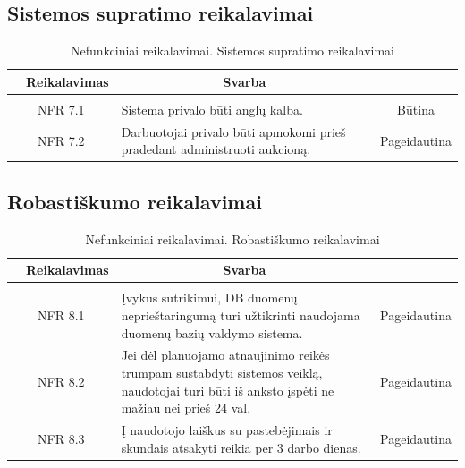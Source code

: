 \documentclass{VUMIFPSkursinis}
\begin{document}
	\subsection{Sistemos supratimo reikalavimai}
	\begin{table}[H]
		\caption{Nefunkciniai reikalavimai. Sistemos supratimo reikalavimai}
		\begin{tabular}{|p{1cm}|p{1cm}|p{}|p{}|}
			\hline
			\rowcolor{gray!50}
			\multicolumn{2}{|c|}{{\bfseries Kodas}}&
			\multicolumn{1}{c|}{{\bfseries Reikalavimas}}&
			\multicolumn{1}{c|}{{\bfseries Svarba}}\\
			\hline
			\rowcolor{lightgray}
			\multicolumn{4}{|c|}{Sistemos supratimo reikalavimai}\\
			\hline
			\multicolumn{2}{|c|}{NFR 7.1}&
			{Sistema privalo būti anglų kalba.}&
			\multicolumn{1}{c|}{Būtina}\\
			\hline
			\multicolumn{2}{|c|}{NFR 7.2}&
			{Darbuotojai privalo būti apmokomi prieš pradedant administruoti aukcioną.}&
			\multicolumn{1}{c|}{Pageidautina}\\
			\hline
		\end{tabular}
	\end{table}

	\subsection{Robastiškumo reikalavimai}
	\begin{table}[H]
		\caption{Nefunkciniai reikalavimai. Robastiškumo reikalavimai}
		\begin{tabular}{|p{1cm}|p{1cm}|p{}|p{}|}
			\hline
			\rowcolor{gray!50}
			\multicolumn{2}{|c|}{{\bfseries Kodas}}&
			\multicolumn{1}{c|}{{\bfseries Reikalavimas}}&
			\multicolumn{1}{c|}{{\bfseries Svarba}}\\
			\hline
			\rowcolor{lightgray}
			\multicolumn{4}{|c|}{Robastiškumo reikalavimai}\\
			\hline
			\multicolumn{2}{|c|}{NFR 8.1}&
			{Įvykus sutrikimui, DB duomenų neprieštaringumą turi užtikrinti naudojama duomenų bazių valdymo sistema.}&
			\multicolumn{1}{c|}{Pageidautina}\\
			\hline
			\multicolumn{2}{|c|}{NFR 8.2}&
			{Jei dėl planuojamo atnaujinimo reikės trumpam sustabdyti sistemos veiklą, naudotojai turi būti iš anksto įspėti ne mažiau nei prieš 24 val.}&
			\multicolumn{1}{c|}{Pageidautina}\\
			\hline
			\multicolumn{2}{|c|}{NFR 8.3}&
			{Į naudotojo laiškus su pastebėjimais ir skundais atsakyti reikia per 3 darbo dienas.}&
			\multicolumn{1}{c|}{Pageidautina}\\
			\hline
		\end{tabular}
	\end{table}
\end{document}
